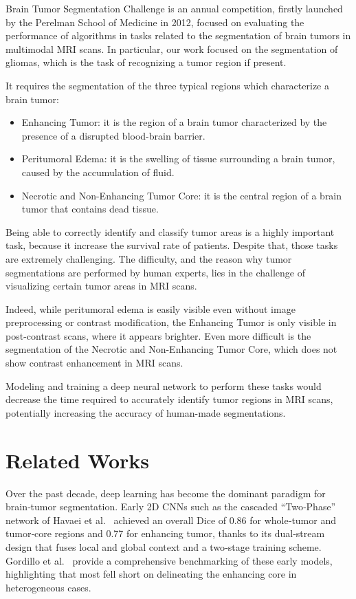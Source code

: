 \documentclass[10pt,twocolumn,letterpaper]{article}
\begin{document}
Brain Tumor Segmentation Challenge is an annual competition, firstly launched by the Perelman School of Medicine\cite{BraTSChallenge} in 2012, focused on evaluating the performance of algorithms in tasks related to the segmentation of brain tumors in multimodal MRI scans. In particular, our work focused on the segmentation of gliomas, which is the task of recognizing a tumor region if present.

It requires the segmentation of the three typical regions which characterize a brain tumor:
    \begin{itemize}
        \item Enhancing Tumor: it is the region of a brain tumor characterized by the presence of a disrupted blood-brain barrier.
        \item Peritumoral Edema: it is the swelling of tissue surrounding a brain tumor, caused by the accumulation of fluid.
        \item Necrotic and Non-Enhancing Tumor Core: it is the central region of a brain tumor that contains dead tissue.
\end{itemize}

Being able to correctly identify and classify tumor areas is a highly important task, because it increase the survival rate of patients. Despite that, those tasks are extremely challenging. The difficulty, and the reason why tumor segmentations are performed by human experts, lies in the challenge of visualizing certain tumor areas in MRI scans.

Indeed, while peritumoral edema is easily visible even without image preprocessing or contrast modification, the Enhancing Tumor is only visible in post-contrast scans, where it appears brighter. Even more difficult is the segmentation of the Necrotic and Non-Enhancing Tumor Core, which does not show contrast enhancement in MRI scans.

Modeling and training a deep neural network to perform these tasks would decrease the time required to accurately identify tumor regions in MRI scans, potentially increasing the accuracy of human-made segmentations.

\section{Related Works}

Over the past decade, deep learning has become the dominant paradigm for brain‐tumor segmentation. Early 2D CNNs such as the cascaded “Two‐Phase” network of Havaei et al.~\cite{HAVAEI201718} achieved an overall Dice of 0.86 for whole‐tumor and tumor‐core regions and 0.77 for enhancing tumor, thanks to its dual‐stream design that fuses local and global context and a two‐stage training scheme. Gordillo et al.~\cite{GORDILLO20131426} provide a comprehensive benchmarking of these early models, highlighting that most fell short on delineating the enhancing core in heterogeneous cases.
\end{document}
